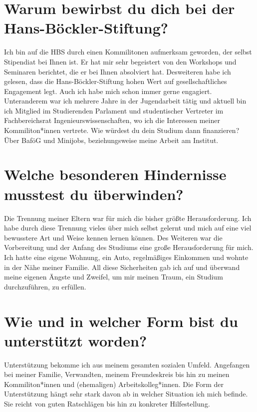 \documentclass[12pt]{scrreprt}
\begin{document}
\section*{Warum bewirbst du dich bei der Hans-Böckler-Stiftung?}
Ich bin auf die HBS durch einen Kommilitonen aufmerksam geworden, der selbst Stipendiat
bei Ihnen ist. Er hat mir sehr begeistert von den Workshops und Seminaren berichtet, die er
bei Ihnen absolviert hat. Desweiteren habe ich gelesen, dass die Hans-Böckler-Stiftung hohen
Wert auf gesellschaftliches Engagement legt. Auch ich habe mich schon immer gerne engagiert.
Unteranderem war ich mehrere Jahre in der Jugendarbeit tätig und aktuell bin ich Mitglied
im Studierenden Parlament und studentischer Vertreter im Fachbereichsrat Ingenieurswissenschaften,
wo ich die Interessen meiner Kommiliton*innen vertrete.
Wie würdest du dein Studium dann finanzieren?
Über BaföG und Minijobs, beziehungsweise meine Arbeit am Institut.
\section*{Welche besonderen Hindernisse musstest du überwinden?}
Die Trennung meiner Eltern war für mich die bisher größte Herausforderung. Ich habe durch
diese Trennung vieles über mich selbst gelernt und mich auf eine viel bewusstere Art und Weise
kennen lernen können. Des Weiteren war die Vorbereitung und der Anfang des Studiums
eine große Herausforderung für mich. Ich hatte eine eigene Wohnung, ein Auto, regelmäßiges
Einkommen und wohnte in der Nähe meiner Familie. All diese Sicherheiten gab ich auf und
überwand meine eigenen Ängste und Zweifel, um mir meinen Traum, ein Studium durchzuführen,
zu erfüllen.
\section*{Wie und in welcher Form bist du unterstützt worden?}
Unterstützung bekomme ich aus meinem gesamten sozialen Umfeld. Angefangen bei meiner
Familie, Verwandten, meinem Freundeskreis bis hin zu meinen Kommiliton*innen und (ehemaligen)
Arbeitskolleg*innen. Die Form der Unterstützung hängt sehr stark davon ab in welcher
Situation ich mich befinde. Sie reicht von guten Ratschlägen bis hin zu konkreter Hilfestellung.
\end{document}
